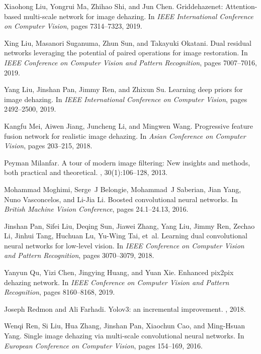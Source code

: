 \documentclass[10pt,twocolumn,letterpaper]{article}
\begin{document}
\begin{thebibliography}{10}
Xiaohong Liu, Yongrui Ma, Zhihao Shi, and Jun Chen.
\newblock Griddehazenet: Attention-based multi-scale network for image
  dehazing.
\newblock In {\em IEEE International Conference on Computer Vision}, pages
  7314--7323, 2019.

Xing Liu, Masanori Suganuma, Zhun Sun, and Takayuki Okatani.
\newblock Dual residual networks leveraging the potential of paired operations
  for image restoration.
\newblock In {\em IEEE Conference on Computer Vision and Pattern Recognition},
  pages 7007--7016, 2019.

Yang Liu, Jinshan Pan, Jimmy Ren, and Zhixun Su.
\newblock Learning deep priors for image dehazing.
\newblock In {\em IEEE International Conference on Computer Vision}, pages
  2492--2500, 2019.

Kangfu Mei, Aiwen Jiang, Juncheng Li, and Mingwen Wang.
\newblock Progressive feature fusion network for realistic image dehazing.
\newblock In {\em Asian Conference on Computer Vision}, pages 203--215, 2018.

Peyman Milanfar.
\newblock A tour of modern image filtering: New insights and methods, both
  practical and theoretical.
, 30(1):106--128, 2013.

Mohammad Moghimi, Serge~J Belongie, Mohammad~J Saberian, Jian Yang, Nuno
  Vasconcelos, and Li-Jia Li.
\newblock Boosted convolutional neural networks.
\newblock In {\em British Machine Vision Conference}, pages 24.1--24.13, 2016.

Jinshan Pan, Sifei Liu, Deqing Sun, Jiawei Zhang, Yang Liu, Jimmy Ren, Zechao
  Li, Jinhui Tang, Huchuan Lu, Yu-Wing Tai, et~al.
\newblock Learning dual convolutional neural networks for low-level vision.
\newblock In {\em IEEE Conference on Computer Vision and Pattern Recognition},
  pages 3070--3079, 2018.

Yanyun Qu, Yizi Chen, Jingying Huang, and Yuan Xie.
\newblock Enhanced pix2pix dehazing network.
\newblock In {\em IEEE Conference on Computer Vision and Pattern Recognition},
  pages 8160--8168, 2019.

Joseph Redmon and Ali Farhadi.
\newblock Yolov3: an incremental improvement.
, 2018.

Wenqi Ren, Si Liu, Hua Zhang, Jinshan Pan, Xiaochun Cao, and Ming-Hsuan Yang.
\newblock Single image dehazing via multi-scale convolutional neural networks.
\newblock In {\em European Conference on Computer Vision}, pages 154--169,
  2016.


\end{thebibliography}
\end{document}
